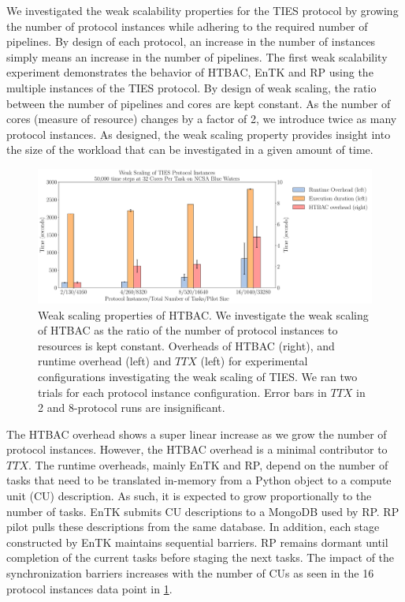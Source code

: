
We investigated the weak scalability properties for the TIES protocol by
growing the number of protocol instances while adhering to the required number
of pipelines. By design of each protocol, an increase in the number of
instances simply means an increase in the number of pipelines. The first weak
scalability experiment demonstrates the behavior of HTBAC, EnTK and RP using
the multiple instances of the TIES protocol. By design of weak scaling, the
ratio between the number of pipelines and cores are kept constant. As the
number of cores (measure of resource) changes by a factor of 2, we introduce
twice as many protocol instances. As designed, the weak scaling property
provides insight into the size of the workload that can be investigated in a
given amount of time.

\begin{figure}
  \centering
   \includegraphics[width=\columnwidth]
   {figures/weak_scaling_TIES_instances_50,000_timesteps_with_16_instances.pdf}
  \caption{Weak scaling properties of HTBAC. We investigate the
  weak scaling of HTBAC as the ratio of the number of protocol instances to
  resources is kept constant. Overheads of HTBAC (right), and runtime overhead 
  (left) and \(TTX\) (left) for experimental configurations investigating the 
  weak scaling of TIES. We ran two trials for each protocol instance 
  configuration. Error bars in \(TTX\) in 2 and 8-protocol runs are 
  insignificant.}
\label{fig:weak_scaling}
\end{figure}

The HTBAC overhead shows a super linear increase as we grow the number of protocol
instances. However, the HTBAC overhead is a minimal contributor to \(TTX\).
The runtime overheads, mainly EnTK and RP, depend on the number of tasks that need to
be translated in-memory from a Python object to a compute unit (CU) description.
As such, it is expected to grow proportionally to the number of tasks. EnTK
submits CU descriptions to a MongoDB used by RP. RP pilot pulls these
descriptions from the same database. 
In addition, each stage constructed by EnTK maintains sequential barriers. 
RP remains dormant until completion of the current tasks before staging
the next tasks. The impact of the synchronization barriers increases with the
number of CUs as seen in the 16 protocol instances data point in
\ref{fig:weak_scaling}.

